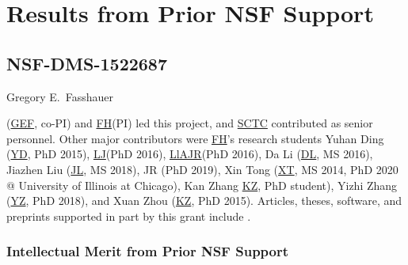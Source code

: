 \documentclass[11pt]{NSFamsart}
\newcommand{\FH}{\hyperlink{FHlink}{FH}\xspace}
\newcommand{\SCTC}{\hyperlink{SCTClink}{SCTC}\xspace}
\newcommand{\GEF}{\hyperlink{GEFlink}{GEF}\xspace}
\newcommand{\YD}{\hyperlink{YDlink}{YD}\xspace}
\newcommand{\LlAJR}{\hyperlink{LlAJRlink}{LlAJR}\xspace}
\newcommand{\LJ}{\hyperlink{LJlink}{LJ}\xspace}
\newcommand{\XT}{\hyperlink{XTlink}{XT}\xspace}
\newcommand{\KZ}{\hyperlink{KZlink}{KZ}\xspace}
\newcommand{\DL}{\hyperlink{DLlink}{DL}\xspace}
\newcommand{\XZ}{\hyperlink{XZlink}{KZ}\xspace}
\newcommand{\JL}{\hyperlink{JLlink}{JL}\xspace}
\newcommand{\YZ}{\hyperlink{YZlink}{YZ}\xspace}
\begin{document}
\section{Results from Prior NSF Support} \label{sec:prior_work}

\subsection{NSF-DMS-1522687
} \label{sec:PreviousFred}

\hypertarget{GEFlink}{Gregory E.\ Fasshauer} (\GEF, co-PI) and \FH (PI) led this project, and \SCTC contributed as senior personnel.  Other major contributors were \FH's research students \hypertarget{YDlink}{Yuhan Ding} (\YD, PhD 2015), \LJ (PhD 2016),
\LlAJR (PhD 2016), \hypertarget{DLlink}{Da Li} (\DL, MS 2016), \hypertarget{JLlink}{Jiazhen Liu} (\JL, MS 2018), JR (PhD 2019), \hypertarget{XTlink}{Xin Tong} (\XT, MS 2014, PhD 2020 @ University of Illinois at Chicago), \hypertarget{KZlink}{Kan Zhang} \KZ, PhD student), \hypertarget{YZlink}{Yizhi Zhang} (\YZ, PhD 2018), and \hypertarget{XZlink}{Xuan Zhou} (\XZ, PhD 2015).  Articles, theses,
software, and preprints supported in
part by this
grant
include
\cite{ala_augmented_2017,
	ChoEtal17a,
	ChoEtal20a,
	Din15a,
	DinHic20a,
	GilEtal16a,
	Hic17a,
	HicJag18b,
	HicJim16a,
	HicEtal18a,
	HicEtal17a,
	HicKriWoz19a,
	RatHic19a,
	GilJim16b,
	JimHic16a,
	JohFasHic18a,
	Li16a,
	Liu17a,
	MarEtal18a,
	mccourt_stable_2017,
	MCCEtal19a,
	mishra_hybrid_2018,
	MisEtal19a,
	rashidinia_stable_2016,
	rashidinia_stable_2018,
	Zha18a,
	Zha17a,
	Zho15a,
	ZhoHic15a}.

\subsubsection{Intellectual Merit from Prior NSF Support}
\label{previousmeritsubsec}
\phantom{a}
\end{document}
